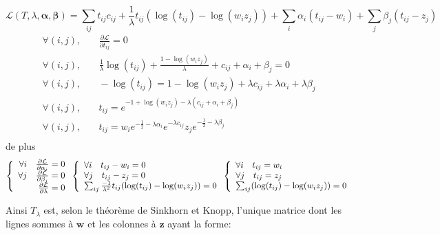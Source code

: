\begin{equation}
\mathcal{L}(T, \lambda, \boldsymbol\alpha, \boldsymbol\beta) = 
\sum_{ij} t_{ij} c_{ij} + \frac{1}{\lambda} t_{ij} (\log(t_{ij})-\log(w_iz_j))
+ \sum_i \alpha_i (t_{ij}-w_i) + \sum_j \beta_j (t_{ij}-z_j)
\end{equation}
\begin{align}
\forall (i,j),&\quad \frac{\partial \mathcal{L}}{\partial t_{ij}} = 0 \\
\forall (i,j),&\quad \frac{1}{\lambda}\log(t_{ij})+\frac{1-\log(w_iz_j)}{\lambda} + c_{ij} + \alpha_i + \beta_j = 0 \\
\forall (i,j),&\quad -\log(t_{ij}) = 1-\log(w_iz_j) + \lambda c_{ij} + \lambda \alpha_i + \lambda \beta_j \\
\forall (i,j),&\quad t_{ij} = e^{-1+\log(w_iz_j) -\lambda(c_{ij} + \alpha_i + \beta_j )} \\
\forall (i,j),&\quad t_{ij} = w_i e^{-\frac{1}{2}-\lambda\alpha_i} e^{ -\lambda c_{ij}} z_j e^{-\frac{1}{2}-\lambda \beta_j} \\
\end{align}
de plus
\begin{equation}
\left \{
\begin{array}{r c l}
\forall i \quad \frac{\partial \mathcal{L}}{\partial \alpha_i} = 0 \\
\forall j \quad \frac{\partial \mathcal{L}}{\partial \beta_j} = 0 \\
\quad \frac{\partial \mathcal{L}}{\partial \lambda} = 0 \\
\end{array}
\right .
\left \{
\begin{array}{l}
\forall i \quad t_{ij}-w_i = 0 \\
\forall j \quad t_{ij}-z_j = 0 \\
\sum_{ij} \frac{-1}{\lambda^2} t_{ij} (\log(t_{ij})-\log(w_iz_j)) = 0 \\
\end{array}
\right .
\left \{
\begin{array}{l}
\forall i \quad t_{ij} = w_i \\
\forall j \quad t_{ij} = z_j \\
\sum_{ij} (\log(t_{ij})-\log(w_iz_j)) = 0\\
\end{array}
\right .
\end{equation}

Ainsi $T_\lambda$ est, selon le théorème de Sinkhorn et Knopp, 
l'unique matrice dont les lignes sommes à $\mathbf{w}$ 
et les colonnes à $\mathbf{z}$ ayant la forme:

